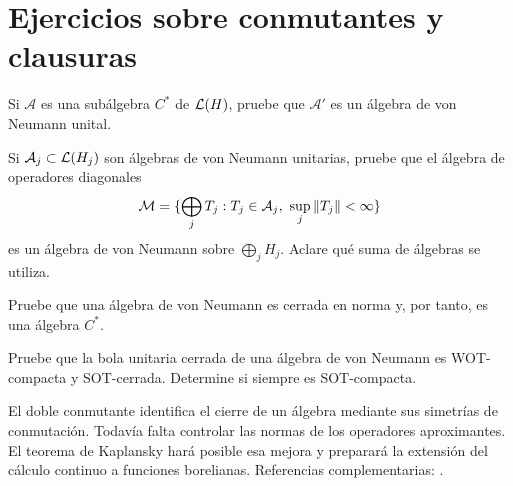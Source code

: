\section{Ejercicios sobre conmutantes y clausuras}

\begin{ejercicio}\label{ej:v3-l32-1}
Si $\mathcal A$ es una subálgebra $C^*$ de $\mathcal L(H)$, pruebe que $\mathcal A'$ es un álgebra de von Neumann unital.
\end{ejercicio}


\begin{ejercicio}\label{ej:v3-l32-2}
Si $\mathcal A_j\subset\mathcal L(H_j)$ son álgebras de von Neumann unitarias, pruebe que el álgebra de operadores diagonales
\[
 \mathcal M=\{\bigoplus_jT_j:T_j\in\mathcal A_j,\ \sup_j\left\lVert T_j\right\rVert<\infty\}
\]
es un álgebra de von Neumann sobre $\bigoplus_jH_j$. Aclare qué suma de álgebras se utiliza.
\end{ejercicio}


\begin{ejercicio}\label{ej:v3-l32-3}
Pruebe que una álgebra de von Neumann es cerrada en norma y, por tanto, es una álgebra $C^*$.
\end{ejercicio}


\begin{ejercicio}\label{ej:v3-l32-4}
Pruebe que la bola unitaria cerrada de una álgebra de von Neumann es WOT-compacta y SOT-cerrada. Determine si siempre es SOT-compacta.
\end{ejercicio}


El doble conmutante identifica el cierre de un álgebra mediante sus simetrías de conmutación. Todavía falta controlar las normas de los operadores aproximantes. El teorema de Kaplansky hará posible esa mejora y preparará la extensión del cálculo continuo a funciones borelianas. Referencias complementarias: \cite{conway1990,murphy1990,zhu1993}.

